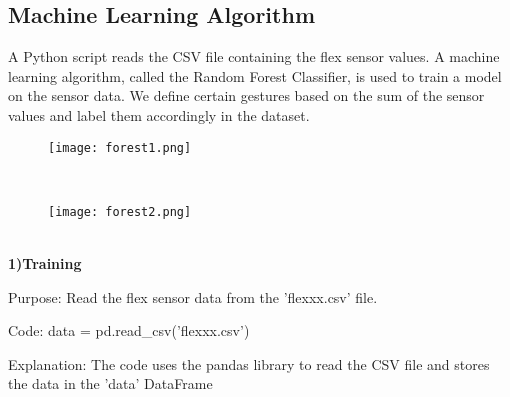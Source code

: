 \documentclass[a4paper,12pt,oneside]{report}
\begin{document}
 \subsection{Machine Learning Algorithm}
 A Python script reads the CSV file
containing the flex sensor values. A machine learning algorithm,
called the Random Forest Classifier, is used to train a model on
the sensor data. We define certain gestures based on the sum of
the sensor values and label them accordingly in the dataset.
\begin{figure}[h]
    \centering
    \begin{minipage}{0.5\textwidth}
        \centering
        \texttt{[image: forest1.png]}
        \label{fig:flex-sensor}
    \end{minipage}
\end{figure}
\\
\begin{figure}[h]
    \centering
    \begin{minipage}{0.5\textwidth}
        \centering
        \texttt{[image: forest2.png]}
        \label{fig:flex-sensor}
    \end{minipage}
\end{figure}
\\
\textbf{\large 1)Training}

Purpose: Read the flex sensor data from the 'flexxx.csv' file.
\par
Code: data = pd.read_csv('flexxx.csv')
\par
Explanation: The code uses the pandas library to read the CSV file and stores the data in the 'data' DataFrame





    
    
    
\end{document}

